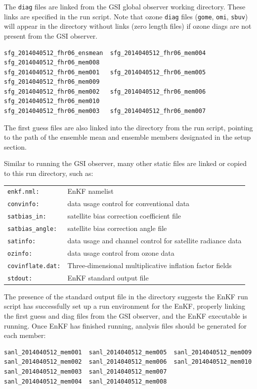 The \verb|diag| files are linked from the GSI global observer working directory. These links are specified in the run script. Note that ozone \verb|diag| files (\verb|gome|, \verb|omi|, \verb|sbuv|) will appear in the directory without links (zero length files) if ozone diags are not present from the GSI observer.

\begin{footnotesize}
\begin{verbatim}
sfg_2014040512_fhr06_ensmean  sfg_2014040512_fhr06_mem004  sfg_2014040512_fhr06_mem008
sfg_2014040512_fhr06_mem001   sfg_2014040512_fhr06_mem005  sfg_2014040512_fhr06_mem009
sfg_2014040512_fhr06_mem002   sfg_2014040512_fhr06_mem006  sfg_2014040512_fhr06_mem010
sfg_2014040512_fhr06_mem003   sfg_2014040512_fhr06_mem007
\end{verbatim}
\end{footnotesize}

The first guess files are also linked into the directory from the run script, pointing to the path of the ensemble mean and ensemble members designated in the setup section.

Similar to running the GSI observer, many other static files are linked or copied to this run directory, such as:
\begin{table}[htbp]
\centering
\begin{tabular}{ll}
\verb|enkf.nml: |           &   EnKF namelist\\
\verb|convinfo:  |          &  data usage control for conventional data\\
\verb|satbias_in:|         &  satellite bias correction coefficient file\\
\verb|satbias_angle:|   &  satellite bias correction angle file\\
\verb|satinfo:|               &  data usage and channel control for satellite radiance data\\
\verb|ozinfo: |               &  data usage control from ozone data\\
\verb|covinflate.dat:|    &  Three-dimensional multiplicative inflation factor fields\\
\verb|stdout:|               &   EnKF standard output file  \\    
\end{tabular}
\end{table}

The presence of the standard output file in the directory suggests the EnKF run script has successfully set up a run environment for the EnKF, properly linking the first guess and diag files from the GSI observer, and the EnKF executable is running. Once EnKF has finished running, analysis files should be generated for each member:
\begin{footnotesize}
\begin{verbatim}
sanl_2014040512_mem001  sanl_2014040512_mem005  sanl_2014040512_mem009
sanl_2014040512_mem002  sanl_2014040512_mem006  sanl_2014040512_mem010
sanl_2014040512_mem003  sanl_2014040512_mem007
sanl_2014040512_mem004  sanl_2014040512_mem008
\end{verbatim}
\end{footnotesize}

